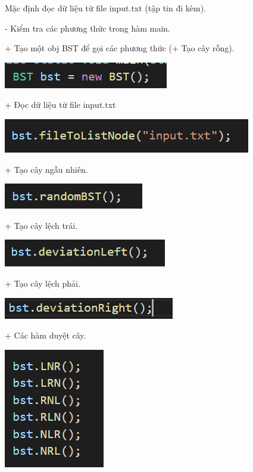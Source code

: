 \documentclass{report}
\begin{document}
Mặc định đọc dữ liệu từ file input.txt (tập tin đi kèm). 

\bigskip
- Kiểm tra các phương thức trong hàm main.

+ Tạo một obj BST để gọi các phương thức (+ Tạo cây rỗng).
\begin{center}
     \includegraphics[scale=1]{r}
    \end{center}

+ Đọc dữ liệu từ file input.txt
\begin{center}
     \includegraphics[scale=1]{s}
    \end{center}

+ Tạo cây ngẫu nhiên.
\begin{center}
     \includegraphics[scale=1]{t}
    \end{center}

+ Tạo cây lệch trái.
\begin{center}
     \includegraphics[scale=1]{u}
    \end{center}

+ Tạo cây lệch phải.
\begin{center}
     \includegraphics[scale=1]{v}
    \end{center}

+ Các hàm duyệt cây.
\begin{center}
     \includegraphics[scale=1.2]{w}
    \end{center}
\end{document}
